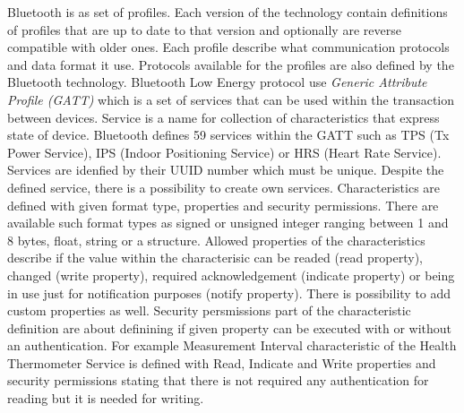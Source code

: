 \documentclass[../main.tex]{subfiles}
\begin{document}
Bluetooth is as set of profiles. Each version of the technology contain definitions of profiles that are up to date to that version and optionally are reverse compatible with older ones. Each profile describe what communication protocols and data format it use. Protocols available for the profiles are also defined by the Bluetooth technology. Bluetooth Low Energy protocol use \textit{Generic Attribute Profile (GATT)} which is a set of services that can be used within the transaction between devices. Service is a name for collection of characteristics that express state of device. Bluetooth defines 59 services within the GATT such as TPS (Tx Power Service), IPS (Indoor Positioning Service) or HRS (Heart Rate Service). Services are idenfied by their UUID number which must be unique. Despite the defined service, there is a possibility to create own services. Characteristics are defined with given format type, properties and security permissions. There are available such format types as signed or unsigned integer ranging between 1 and 8 bytes, float, string or a structure. Allowed properties of the characteristics describe if the value within the characterisic can be readed (read property), changed (write property), required acknowledgement (indicate property) or being in use just for notification purposes (notify property). There is possibility to add custom properties as well. Security persmissions part of the characteristic definition are about definining if given property can be executed with or without an authentication. For example Measurement Interval characteristic of the Health Thermometer Service is defined with Read, Indicate and Write properties and security permissions stating that there is not required any authentication for reading but it is needed for writing.
\end{document}
